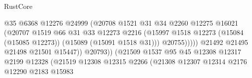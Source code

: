 \begin{lexlean}{RustCore}
\begin{coremodule}
                                                  @35
                                                  @6368
                                                  @12276
                                                  @24999
                                                  (@20708
                                                    @1521
                                                    @31
                                                    @34
                                                    @2260
                                                    @12275
                                                    @16021
                                                    (@20707
                                                      @1519
                                                      @66
                                                      @31
                                                      @33
                                                      @12273
                                                      @2216
                                                      (@15997
                                                        @1518
                                                        @12273
                                                        (@15084 (@15085 @12273))
                                                        (@15089 (@15091 @1518 @31)))
                                                      @20755)))))
                                            @21492
                                            @21495
                                            @21498
                                            @21501
                                            @15447))
                                        @20793))
                                    (@21509
                                      @1537
                                      @95
                                      @45
                                      @12308
                                      @12317
                                      @2199
                                      @12328
                                      (@21519
                                        @12308
                                        @12315
                                        @2266
                                        (@21308
                                          @12307
                                          @12314
                                          @2176
                                          @12290
                                          @2183
                                          @15983

\end{coremodule}
\end{lexlean}
